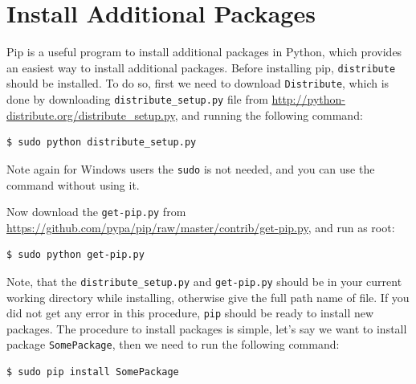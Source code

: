 \documentclass[10pt]{book}
\begin{document}

\section{Install Additional Packages}
\label{install}
Pip is a useful program to install additional packages in Python, which provides an 
easiest way to install additional packages. 
Before installing pip, \verb"distribute" should be installed. 
To do so, first we need to download \verb"Distribute", 
which is done by downloading \verb"distribute_setup.py" file from 
\url{http://python-distribute.org/distribute\_setup.py}, 
and running the following command:
\beforeverb
\begin{verbatim}
$ sudo python distribute_setup.py
\end{verbatim}
\afterverb
Note again for Windows users the \verb"sudo" is not needed, and you can use the command
without using it. \\


Now download the \verb"get-pip.py" from 
\url{https://github.com/pypa/pip/raw/master/contrib/get-pip.py}, and run as root:
\beforeverb
\begin{verbatim}
$ sudo python get-pip.py
\end{verbatim}
\afterverb

Note, that the \verb"distribute_setup.py" and \verb"get-pip.py" should be in 
your current working directory while installing, otherwise give the full path 
name of file. If you did not get any error in this procedure, \verb"pip" should 
be ready to install new packages. The procedure to install packages is simple, let's say
we want to install package \verb"SomePackage", then we need to run the following command:
\beforeverb
\begin{verbatim}
$ sudo pip install SomePackage
\end{verbatim}
\afterverb
\end{document}
